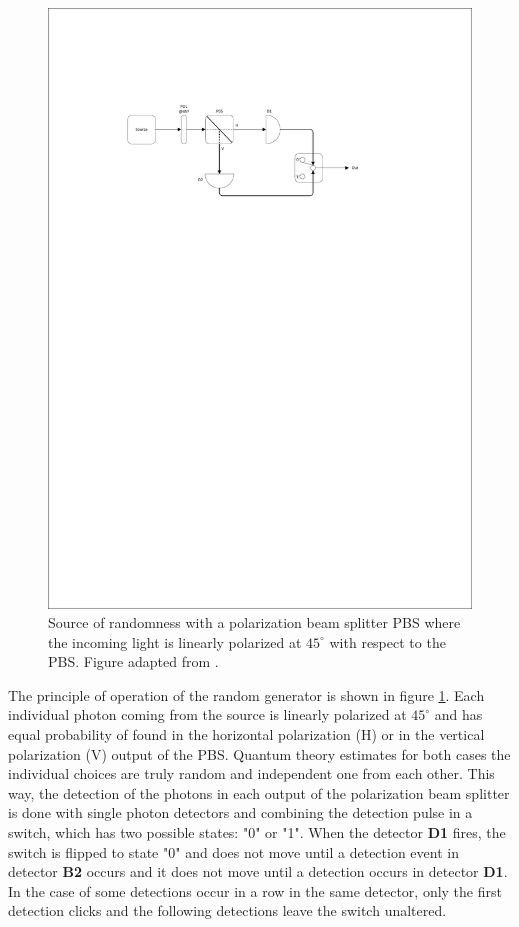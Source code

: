 \begin{figure}[H]
    \centering
        \includegraphics[clip, trim=3cm 20cm 5cm 5cm, width=1.00\textwidth]{./sdf/qrng/figures_raw/Random_Number_Generator.pdf}
    \caption{Source of randomness with a polarization beam splitter PBS where the incoming light is linearly polarized at $45^{\circ}$ with respect to the PBS. Figure adapted from \cite{Zeilinger}.}\label{qrng}
\end{figure}

The principle of operation of the random generator is shown in figure \ref{qrng}. Each individual photon coming from the source is linearly polarized at $45^\circ$ and has equal probability of found in the horizontal polarization (H) or in the vertical polarization (V) output of the PBS. Quantum theory estimates for both cases the individual choices are truly random and independent one from each other. This way, the detection of the photons in each output of the polarization beam splitter is done with single photon detectors and combining the detection pulse in a switch, which has two possible states: "0" \space or "1". When the detector \textbf{D1} fires, the switch is flipped to state "0" \space and does not move until a detection event in detector \textbf{B2} occurs and it does not move until a detection occurs in detector \textbf{D1}. In the case of some detections occur in a row in the same detector, only the first detection clicks and the following detections leave the switch unaltered.

